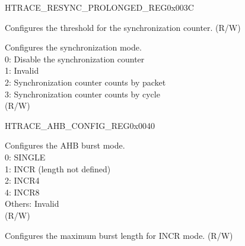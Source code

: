 \begin{register}{H}{TRACE\_RESYNC\_PROLONGED\_REG}{0x003C}\label{regdesc:TRACERESYNCPROLONGEDREG}
%
%
%
\regnewline%
\begin{regdesc}\begin{reglist}
\label{fielddesc:TRACERESYNCPROLONGED}\item [TRACE\_RESYNC\_PROLONGED] Configures the threshold for the synchronization counter. (R/W)
\label{fielddesc:TRACERESYNCMODE}\item [TRACE\_RESYNC\_MODE] Configures the synchronization mode.\\
0: Disable the synchronization counter\\
1: Invalid\\
2: Synchronization counter counts by packet\\
3: Synchronization counter counts by cycle\\
 (R/W)
\end{reglist}\end{regdesc}
\end{register}


\begin{register}{H}{TRACE\_AHB\_CONFIG\_REG}{0x0040}\label{regdesc:TRACEAHBCONFIGREG}
%
%
%
\regnewline%
\begin{regdesc}\begin{reglist}
\label{fielddesc:TRACEHBURST}\item [TRACE\_HBURST] Configures the AHB burst mode.\\
0: SINGLE\\
1: INCR (length not defined)\\
2: INCR4\\
4: INCR8\\
Others: Invalid\\
(R/W)
\label{fielddesc:TRACEMAXINCR}\item [TRACE\_MAX\_INCR] Configures the maximum burst length for INCR mode. (R/W)
\end{reglist}\end{regdesc}
\end{register}


